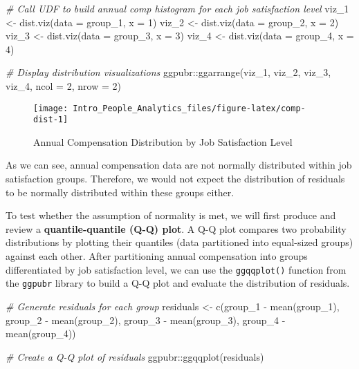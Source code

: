 \documentclass[
]{book}
\newenvironment{Shaded}{\begin{snugshade}}{\end{snugshade}}
\newcommand{\AttributeTok}[1]{\textcolor[rgb]{0.77,0.63,0.00}{#1}}
\newcommand{\CommentTok}[1]{\textcolor[rgb]{0.56,0.35,0.01}{\textit{#1}}}
\newcommand{\DecValTok}[1]{\textcolor[rgb]{0.00,0.00,0.81}{#1}}
\newcommand{\FunctionTok}[1]{\textcolor[rgb]{0.00,0.00,0.00}{#1}}
\newcommand{\NormalTok}[1]{#1}
\newcommand{\OtherTok}[1]{\textcolor[rgb]{0.56,0.35,0.01}{#1}}
\newcommand{\SpecialCharTok}[1]{\textcolor[rgb]{0.00,0.00,0.00}{#1}}
\begin{document}
\begin{Shaded}
\begin{Highlighting}[]
\CommentTok{\# Call UDF to build annual comp histogram for each job satisfaction level}
\NormalTok{viz\_1 }\OtherTok{\textless{}{-}} \FunctionTok{dist.viz}\NormalTok{(}\AttributeTok{data =}\NormalTok{ group\_1, }\AttributeTok{x =} \DecValTok{1}\NormalTok{)}
\NormalTok{viz\_2 }\OtherTok{\textless{}{-}} \FunctionTok{dist.viz}\NormalTok{(}\AttributeTok{data =}\NormalTok{ group\_2, }\AttributeTok{x =} \DecValTok{2}\NormalTok{)}
\NormalTok{viz\_3 }\OtherTok{\textless{}{-}} \FunctionTok{dist.viz}\NormalTok{(}\AttributeTok{data =}\NormalTok{ group\_3, }\AttributeTok{x =} \DecValTok{3}\NormalTok{)}
\NormalTok{viz\_4 }\OtherTok{\textless{}{-}} \FunctionTok{dist.viz}\NormalTok{(}\AttributeTok{data =}\NormalTok{ group\_4, }\AttributeTok{x =} \DecValTok{4}\NormalTok{)}

\CommentTok{\# Display distribution visualizations}
\NormalTok{ggpubr}\SpecialCharTok{::}\FunctionTok{ggarrange}\NormalTok{(viz\_1, viz\_2, viz\_3, viz\_4,}
          \AttributeTok{ncol =} \DecValTok{2}\NormalTok{, }\AttributeTok{nrow =} \DecValTok{2}\NormalTok{)}
\end{Highlighting}
\end{Shaded}

\begin{figure}

{\centering \texttt{[image: Intro\_People\_Analytics\_files/figure-latex/comp-dist-1]} 

}

\caption{Annual Compensation Distribution by Job Satisfaction Level}\label{fig:comp-dist}
\end{figure}

As we can see, annual compensation data are not normally distributed within job satisfaction groups. Therefore, we would not expect the distribution of residuals to be normally distributed within these groups either.

To test whether the assumption of normality is met, we will first produce and review a \textbf{quantile-quantile (Q-Q) plot}. A Q-Q plot compares two probability distributions by plotting their quantiles (data partitioned into equal-sized groups) against each other. After partitioning annual compensation into groups differentiated by job satisfaction level, we can use the \texttt{ggqqplot()} function from the \texttt{ggpubr} library to build a Q-Q plot and evaluate the distribution of residuals.

\begin{Shaded}
\begin{Highlighting}[]
\CommentTok{\# Generate residuals for each group}
\NormalTok{residuals }\OtherTok{\textless{}{-}} \FunctionTok{c}\NormalTok{(group\_1 }\SpecialCharTok{{-}} \FunctionTok{mean}\NormalTok{(group\_1), group\_2 }\SpecialCharTok{{-}} \FunctionTok{mean}\NormalTok{(group\_2), group\_3 }\SpecialCharTok{{-}} \FunctionTok{mean}\NormalTok{(group\_3), group\_4 }\SpecialCharTok{{-}} \FunctionTok{mean}\NormalTok{(group\_4))}

\CommentTok{\# Create a Q{-}Q plot of residuals}
\NormalTok{ggpubr}\SpecialCharTok{::}\FunctionTok{ggqqplot}\NormalTok{(residuals)}
\end{Highlighting}
\end{Shaded}
\end{document}
